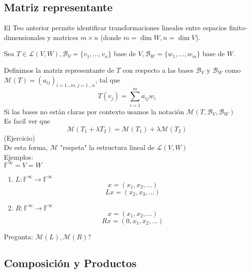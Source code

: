 \documentclass[11pt]{book}
\theoremstyle{definition}
\begin{document}
\subsection{Matriz representante}

El Teo anterior permite identificar transformaciones lineales entre espacios finito-dimensionales y matrices $m\times n$ (donde $m=\dim W,n=\dim V$).

Sea $T\in\mathcal{L}(V,W),\mathcal{B}_V=\{v_1,...,v_n\}$ base de $V,\mathcal{B}_W=\{w_1,...,w_m\}$ base de $W$.

Definimos la matriz representante de $T$ con respecto a las bases $\mathcal{B}_V$ y $\mathcal{B}_W$ como $\mathcal{M}(T)=(a_{ij})_{i=1...m,j=1...n}$, tal que
\[
	T(v_j)=\sum^m_{i=1}a_{ij}w_i
\]
Si las bases no están claras por contexto usamos la notación $\mathcal{M}(T,\mathcal{B}_V,\mathcal{B}_W)$\\
Es facil ver que
\[
	\mathcal{M}(T_1+\lambda T_2)=\mathcal{M}(T_1)+\lambda\mathcal{M}(T_2)
\]
(Ejercicio)\\
De esta forma, $\mathcal{M}$ "respeta" la estructura lineal de $\mathcal{L}(V,W)$\\
Ejemplos:\\
$\mathbb{F}^\infty=V=W$
\begin{enumerate}
	\item $L:\mathbb{F}^\infty\rightarrow\mathbb{F}^\infty$
	      \[
		      x=(x_1,x_2,...)
	      \]
	      \[
		      Lx=(x_2,x_3,...)
	      \]

	\item $R:\mathbb{F}^\infty\rightarrow\mathbb{F}^\infty$
	      \[
		      x=(x_1,x_2,...)
	      \]
	      \[
		      Rx=(0,x_1,x_2,...)
	      \]
\end{enumerate}
Pregunta: $\mathcal{M}(L),\mathcal{M}(R)$?
\subsection{Composición y Productos}
\end{document}
